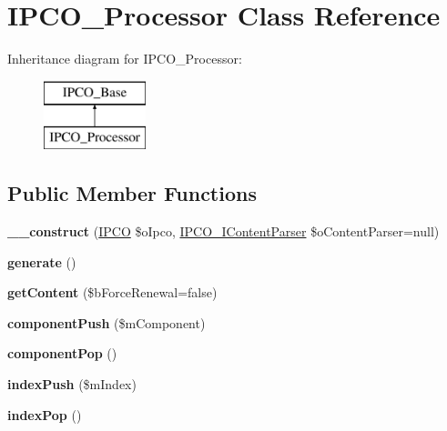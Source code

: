 \hypertarget{class_i_p_c_o___processor}{\section{I\-P\-C\-O\-\_\-\-Processor Class Reference}
\label{class_i_p_c_o___processor}
}
Inheritance diagram for I\-P\-C\-O\-\_\-\-Processor\-:\begin{figure}[H]
\begin{center}
\leavevmode
\includegraphics[height=2.000000cm]{class_i_p_c_o___processor}
\end{center}
\end{figure}
\subsection*{Public Member Functions}
\begin{DoxyCompactItemize}
\item 
\hypertarget{class_i_p_c_o___processor_ae4a04ea9cecc5d053dc1c7733fff427d}{{\bfseries \-\_\-\-\_\-construct} (\hyperlink{class_i_p_c_o}{I\-P\-C\-O} \$o\-Ipco, \hyperlink{interface_i_p_c_o___i_content_parser}{I\-P\-C\-O\-\_\-\-I\-Content\-Parser} \$o\-Content\-Parser=null)}\label{class_i_p_c_o___processor_ae4a04ea9cecc5d053dc1c7733fff427d}

\item 
\hypertarget{class_i_p_c_o___processor_adef539a2c988a14afe6f924e04d09483}{{\bfseries generate} ()}\label{class_i_p_c_o___processor_adef539a2c988a14afe6f924e04d09483}

\item 
\hypertarget{class_i_p_c_o___processor_aa2fef03cef5039c3bc042a3a598cddd9}{{\bfseries get\-Content} (\$b\-Force\-Renewal=false)}\label{class_i_p_c_o___processor_aa2fef03cef5039c3bc042a3a598cddd9}

\item 
\hypertarget{class_i_p_c_o___processor_a4f6a3ee77b1ad8bad2eb393ac5f530ea}{{\bfseries component\-Push} (\$m\-Component)}\label{class_i_p_c_o___processor_a4f6a3ee77b1ad8bad2eb393ac5f530ea}

\item 
\hypertarget{class_i_p_c_o___processor_adfcf7242c17ac285dd695518152f1be1}{{\bfseries component\-Pop} ()}\label{class_i_p_c_o___processor_adfcf7242c17ac285dd695518152f1be1}

\item 
\hypertarget{class_i_p_c_o___processor_ac57481f5dd1fd8362011cd8997f94d08}{{\bfseries index\-Push} (\$m\-Index)}\label{class_i_p_c_o___processor_ac57481f5dd1fd8362011cd8997f94d08}

\item 
\hypertarget{class_i_p_c_o___processor_a8a6509d6c921a682e09d7dd2ab8a27e8}{{\bfseries index\-Pop} ()}\label{class_i_p_c_o___processor_a8a6509d6c921a682e09d7dd2ab8a27e8}

\end{DoxyCompactItemize}

